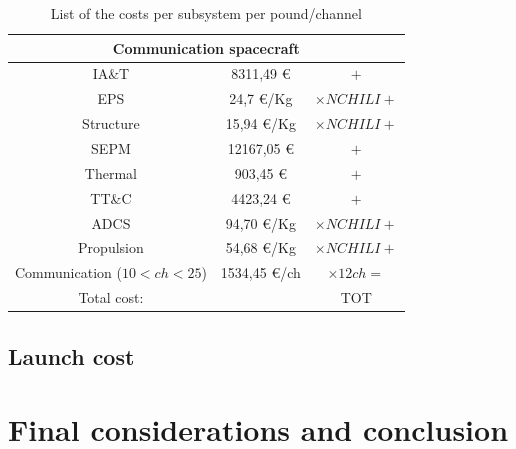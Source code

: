 \documentclass[11pt,a4paper,titlepage]{article}
\begin{document}
\begin{table}
\centering
\begin{tabular}{ccc}
\toprule
\multicolumn{3}{c}{Communication spacecraft}\\
\midrule
IA\&T       & 8311,49 \euro       & $+$\\
EPS          & 24,7 \euro/Kg        & $\times NCHILI +$\\
Structure   & 15,94  \euro/Kg     & $\times NCHILI +$\\
SEPM        & 12167,05 \euro     & $+$\\
Thermal    & 903,45 \euro        & $+$\\
TT\&C       & 4423,24 \euro      & $+$\\ 
ADCS        & 94,70 \euro/Kg     & $\times NCHILI +$\\
Propulsion & 54,68   \euro/Kg   & $\times NCHILI +$\\
Communication ($10 < ch < 25$) & 1534,45 \euro/ch & $\times 12 ch =$\\
\bottomrule
Total cost:& & TOT\\
\end{tabular}
\caption{List of the costs per subsystem per pound/channel}
\label{tab:cost}
\end{table}



	\subsection{Launch cost}

\section{Final considerations and conclusion}
\lipsum[1]
\end{document}
